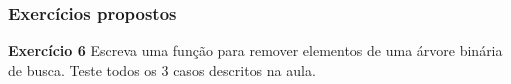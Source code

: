 \documentclass{beamer}
\begin{document}
\begin{frame}
  \frametitle{Exercícios propostos}

  \textbf{Exercício 6} Escreva uma função para remover elementos
  de uma árvore binária de busca. Teste todos os 3 casos descritos
  na aula.

\end{frame}

%  
\end{document}
